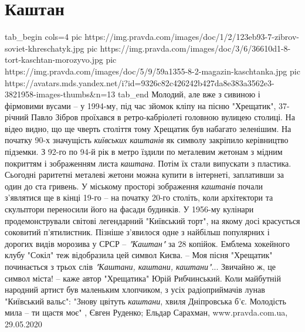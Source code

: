  
 
 
 
 
\chapter{Каштан}

\ifcmt
  tab_begin cols=4
     pic https://img.pravda.com/images/doc/1/2/123eb93-7-zibrov-soviet-khreschatyk.jpg
     pic https://img.pravda.com/images/doc/3/6/36610d1-8-tort-kaschtan-morozyvo.jpg
		 pic https://img.pravda.com/images/doc/5/9/59a1355-8-2-magazin-kaschtanka.jpg
		 pic https://avatars.mds.yandex.net/i?id=9326c82c426242b427da8e383a3562e3-3821958-images-thumbs&n=13
  tab_end
\fi
Молодий, але вже з сивиною і фірмовими вусами – у 1994-му, під час зйомок кліпу
на пісню "Хрещатик", 37-річний Павло Зібров проїхався в ретро-кабріолеті
головною вулицею столиці.  На відео видно, що ще чверть століття тому Хрещатик
був набагато зеленішим. На початку 90-х значущість \emph{київських каштанів} як
символу закріпило керівництво підземки.  З 92-го по 94-й рік в метро їздили по
металевим жетонам з мідним покриттям і зображенням листа \emph{каштана}. Потім їх
стали випускати з пластика. Сьогодні раритетні металеві жетони можна купити в
інтернеті, заплативши за один до ста гривень.  У міському просторі зображення
\emph{каштанів} почали з'являтися ще в кінці 19-го – на початку 20-го століть, коли
архітектори та скульптори переносили його на фасади будинків.  У 1956-му
кулінари продемонстрували світові легендарний "Київський торт", на якому досі
красується соковитий п’ятилистник. Пізніше з'явилося одне з найбільш популярних
і дорогих видів морозива у СРСР – \emph{"Каштан"} за 28 копійок. Емблема хокейного
клубу "Сокіл" теж відобразила цей символ Києва.  – Моя пісня "Хрещатик"
починається з трьох слів \emph{"Каштани, каштани, каштани"}...  Звичайно ж, це
символ міста! – каже автор "Хрещатика" Юрій Рибчинський.  Коли майбутній
народний артист був маленьким хлопчиком, з усіх радіоприймачів лунав "Київський
вальс": "Знову цвітуть \emph{каштани}, хвиля Дніпровська б'є. Молодість мила –
ти щастя моє"
, 
Євген Руденко; Ельдар Сарахман, www.pravda.com.ua, 29.05.2020
